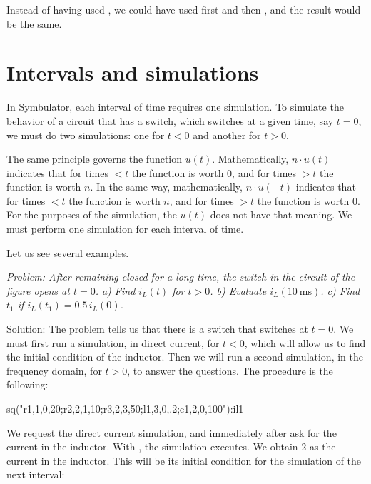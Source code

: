 Instead of having used
, we could have used first
 and then ,
and the result would be the same.

\section{Intervals and simulations}

In Symbulator, each interval of time requires one simulation. To
simulate the behavior of a circuit that has a switch, which switches
at a given time, say $t = 0$, we must do two simulations: one for
$t < 0$ and another for $t > 0$.

The same principle governs the function $u(t)$. Mathematically,
$n \cdot u(t)$ indicates that for times $< t$ the function is worth
0, and for times $> t$ the function is worth $n$. In the same way,
mathematically, $n \cdot u(-t)$ indicates that for times $< t$ the
function is worth $n$, and for times $> t$ the function is worth 0.
For the purposes of the simulation, the $u(t)$ does not have that
meaning. We must perform one simulation for each interval of time.

Let us see several examples.


\emph{Problem: After remaining closed for a long time, the switch in
the circuit of the figure opens at $t = 0$. a) Find $i_L(t)$ for
$t > 0$. b) Evaluate $i_L(10~\mathrm{ms})$. c) Find $t_1$ if
$i_L(t_1) = 0.5\,i_L(0)$.}

Solution: The problem tells us that there is a switch that switches
at $t = 0$. We must first run a simulation, in direct current, for
$t < 0$, which will allow us to find the initial condition of the
inductor. Then we will run a second simulation, in the frequency
domain, for $t > 0$, to answer the questions. The procedure is the
following:

\begin{entry}
sq\dc("r1,1,0,20;r2,2,1,10;r3,2,3,50;l1,3,0,.2;e1,2,0,100"):il1
\end{entry}

We request the direct current simulation, and immediately after ask
for the current in the inductor. With , the simulation
executes. We obtain 2 as the current in the inductor. This will be
its initial condition for the simulation of the next interval:

